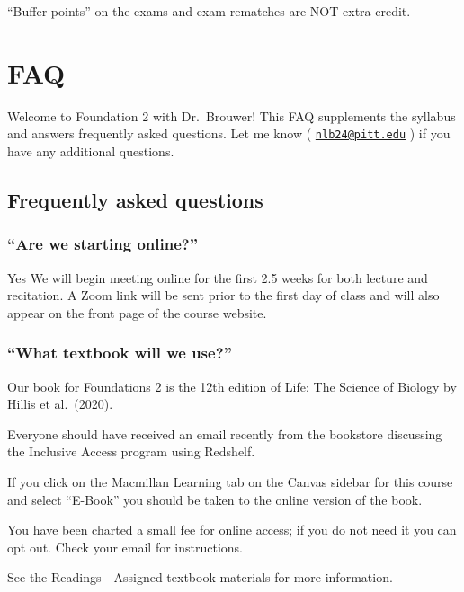 \documentclass[
]{book}
\begin{document}
``Buffer points'' on the exams and exam rematches are NOT extra credit.

\hypertarget{faq}{%
\chapter{FAQ}\label{faq}}

Welcome to Foundation 2 with Dr.~Brouwer! This FAQ supplements the syllabus and answers frequently asked questions. Let me know ( \href{mailto:nlb24@pitt.edu}{\nolinkurl{nlb24@pitt.edu}} ) if you have any additional questions.

\hypertarget{frequently-asked-questions}{%
\section{Frequently asked questions}\label{frequently-asked-questions}}

\hypertarget{are-we-starting-online}{%
\subsection{``Are we starting online?''}\label{are-we-starting-online}}

Yes We will begin meeting online for the first 2.5 weeks for both lecture and recitation. A Zoom link will be sent prior to the first day of class and will also appear on the front page of the course website.

\hypertarget{what-textbook-will-we-use}{%
\subsection{``What textbook will we use?''}\label{what-textbook-will-we-use}}

Our book for Foundations 2 is the 12th edition of Life: The Science of Biology by Hillis et al.~(2020).

Everyone should have received an email recently from the bookstore discussing the Inclusive Access program using Redshelf.

If you click on the Macmillan Learning tab on the Canvas sidebar for this course and select ``E-Book'' you should be taken to the online version of the book.

You have been charted a small fee for online access; if you do not need it you can opt out. Check your email for instructions.

See the Readings - Assigned textbook materials for more information.
\end{document}

